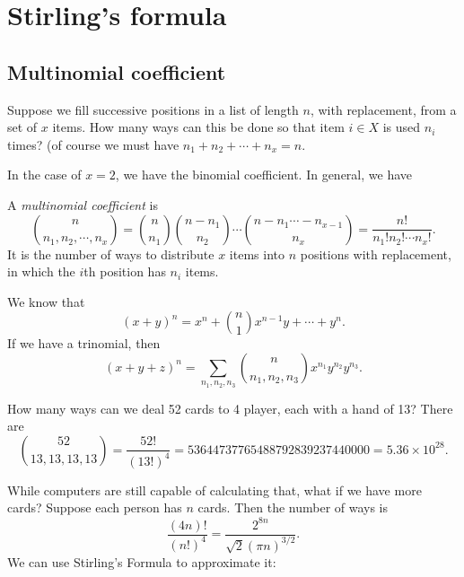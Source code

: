\documentclass[a4paper]{article}
\begin{document}
\section{Stirling's formula}
\subsection{Multinomial coefficient}
Suppose we fill successive positions in a list of length $n$, with replacement, from a set of $x$ items. How many ways can this be done so that item $i\in X$ is used $n_i$ times? (of course we must have $n_1 + n_2 + \cdots + n_x = n$.

In the case of $x = 2$, we have the binomial coefficient. In general, we have
\begin{defi}
  A \emph{multinomial coefficient} is
  \[
    \binom{n}{n_1, n_2, \cdots, n_x} = \binom{n}{n_1}\binom{n - n_1}{n_2}\cdots \binom{n - n_1\cdots - n_{x - 1}}{n_x} = \frac{n!}{n_1!n_2!\cdots n_x!}.
  \]
  It is the number of ways to distribute $x$ items into $n$ positions with replacement, in which the $i$th position has $n_i$ items.
\end{defi}

\begin{eg}
  We know that
  \[
    (x + y)^n = x^n + \binom{n}{1}x^{n - 1}y + \cdots + y^n.
  \]
  If we have a trinomial, then
  \[
    (x + y + z)^n = \sum_{n_1, n_2, n_3} \binom{n}{n_1, n_2, n_3} x^{n_1}y^{n_2}y^{n_3}.
  \]
\end{eg}

\begin{eg}
  How many ways can we deal 52 cards to 4 player, each with a hand of 13? There are
  \[
    \binom{52}{13, 13, 13, 13} = \frac{52!}{(13!)^4} = 53644737765488792839237440000 = 5.36\times 10^{28}.
  \]
\end{eg}
While computers are still capable of calculating that, what if we have more cards? Suppose each person has $n$ cards. Then the number of ways is
\[
  \frac{(4n)!}{(n!)^4} = \frac{2^{8n}}{\sqrt{2} (\pi n)^{3/2}}.
\]
We can use Stirling's Formula to approximate it:
\end{document}
